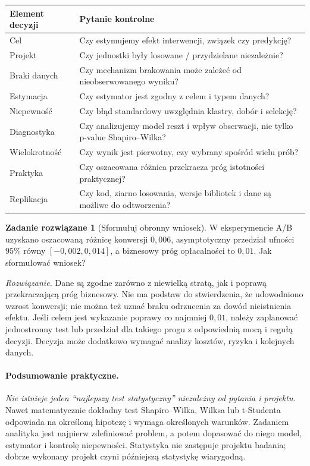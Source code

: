 \documentclass[11pt,a4paper,oneside]{report}
\numberwithin{equation}{chapter}
\theoremstyle{plain}
\theoremstyle{definition}
\newtheorem{zadanie}{Zadanie rozwiązane}[chapter]
\theoremstyle{remark}
\begin{document}
\begin{center}\small
\begin{tabular}{>{\raggedright\arraybackslash}p{}>{\raggedright\arraybackslash}p{}}
\toprule
\textbf{Element decyzji} & \textbf{Pytanie kontrolne}\\
\midrule
Cel & Czy estymujemy efekt interwencji, związek czy predykcję?\\
Projekt & Czy jednostki były losowane / przydzielane niezależnie?\\
Braki danych & Czy mechanizm brakowania może zależeć od nieobserwowanego wyniku?\\
Estymacja & Czy estymator jest zgodny z celem i typem danych?\\
Niepewność & Czy błąd standardowy uwzględnia klastry, dobór i selekcję?\\
Diagnostyka & Czy analizujemy model reszt i wpływ obserwacji, nie tylko p-value Shapiro--Wilka?\\
Wielokrotność & Czy wynik jest pierwotny, czy wybrany spośród wielu prób?\\
Praktyka & Czy oszacowana różnica przekracza próg istotności praktycznej?\\
Replikacja & Czy kod, ziarno losowania, wersje bibliotek i dane są możliwe do odtworzenia?\\
\bottomrule
\end{tabular}
\end{center}

\begin{zadanie}[Sformułuj obronny wniosek]
W eksperymencie A/B uzyskano oszacowaną różnicę konwersji $0{,}006$, asymptotyczny przedział ufności $95\%$ równy $[-0{,}002,0{,}014]$, a biznesowy próg opłacalności to $0{,}01$. Jak sformułować wniosek?\par
\emph{Rozwiązanie.} Dane są zgodne zarówno z niewielką stratą, jak i poprawą przekraczającą próg biznesowy. Nie ma podstaw do stwierdzenia, że udowodniono wzrost konwersji; nie można też uznać braku odrzucenia za dowód nieistnienia efektu. Jeśli celem jest wykazanie poprawy co najmniej $0{,}01$, należy zaplanować jednostronny test lub przedział dla takiego progu z odpowiednią mocą i regułą decyzji. Decyzja może dodatkowo wymagać analizy kosztów, ryzyka i kolejnych danych.
\end{zadanie}

\paragraph{Podsumowanie praktyczne.}
\emph{Nie istnieje jeden ``najlepszy test statystyczny'' niezależny od pytania i projektu.} Nawet matematycznie dokładny test Shapiro--Wilka, Wilksa lub t-Studenta odpowiada na określoną hipotezę i wymaga określonych warunków. Zadaniem analityka jest najpierw zdefiniować problem, a potem dopasować do niego model, estymator i kontrolę niepewności. Statystyka nie zastępuje projektu badania; dobrze wykonany projekt czyni późniejszą statystykę wiarygodną.
\end{document}
